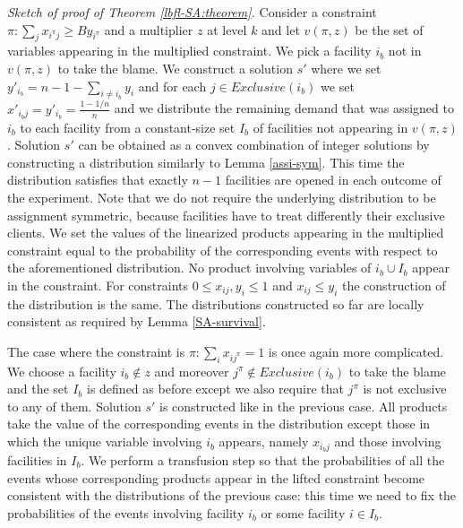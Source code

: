 \documentclass[11pt]{article}
\begin{document}
\vspace*{0.2cm}
\noindent
{\em Sketch of proof of Theorem \ref{lbfl-SA:theorem}.}
Consider a constraint $\pi: \sum_{j}x_{i^{\pi}j}\geq By_{i^{\pi}}$ and
a  multiplier $z$  at  level $k$  and  let $v(\pi,z)$  be  the set  of
variables appearing in the  multiplied constraint.  We pick a facility
$i_b$ not  in $v(\pi,z)$  to take the  blame. We construct  a solution
$s'$ where we set $y'_{i_b}=n-1-\sum_{i\neq i_b}y_{i}$ and for each $j
\in  Exclusive(i_b)$ we  set  $x'_{i_bj}=y'_{i_b}=\frac{1-1/n}{n}$ and  we
distribute the remaining demand that was assigned to $i_b$ to each
facility from a constant-size set $I_b$ of facilities  not appearing in
$v(\pi,z)$. Solution $s'$  can be obtained as a  convex combination of
integer solutions  by constructing  a distribution similarly  to Lemma
\ref{assi-sym}. This time the distribution satisfies 
 that exactly  $n-1$ facilities are opened in
each  outcome of the  experiment. Note that we do not require the 
underlying distribution to be assignment symmetric, 
because facilities have to treat differently their exclusive clients. 
We  set the  
values of  the linearized products appearing in the multiplied constraint
equal to  the probability of the  corresponding events with respect  
to the aforementioned  distribution. No product involving variables of 
$i_b\cup I_b$ appear in the constraint.  For  constraints 
$0\leq  x_{ij},y_i \leq 1$  and $x_{ij} \leq y_{i}  $ the  construction 
of the  distribution is the  same. The distributions constructed so far
 are locally consistent as required by Lemma \ref{SA-survival}.

The case where the constraint is $\pi: \sum_{i}x_{ij^{\pi}}=1$ is once
again  more complicated.   We choose  a  facility $i_b  \notin z$  and
moreover $j^{\pi}\notin Exclusive(i_b)$ to  take the blame and the set
$I_b$ is  defined as before except  we also require  that $j^{\pi}$ is
not exclusive to any of them. Solution $s'$ is constructed like in the
previous case. All products take the value of the corresponding events
in the  distribution except those in which the  unique variable involving
$i_b$  appears, namely  $x_{i_bj}$ and  those involving  facilities in
$I_b$. We perform a transfusion  step so that the probabilities of all
the  events   whose  corresponding  products  appear   in  the  lifted
constraint become consistent with the distributions of the previous
case:  this  time we  need  to fix  the  probabilities  of the  events
involving facility $i_b$ or some facility $i\in I_b$.
\end{document}
